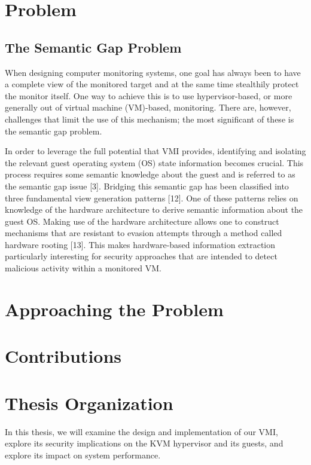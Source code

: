 \documentclass{report}
\begin{document}
\begin{spacing}{1.5}
\section{Problem}
\subsection{The Semantic Gap Problem}
When designing computer monitoring systems, one goal has always been to have a complete view of the
monitored target and at the same time stealthily protect the monitor itself. One way to achieve this is to
use hypervisor-based, or more generally out of virtual machine (VM)-based, monitoring. There are, however,
challenges that limit the use of this mechanism; the most significant of these is the semantic gap problem.



In order to leverage the full potential that VMI provides, identifying and
isolating the relevant guest operating system (OS) state information becomes
crucial. This process requires some semantic knowledge about the guest and is
referred to as the semantic gap issue [3]. Bridging this semantic gap has been
classified into three fundamental view generation patterns [12]. One of these
patterns relies on knowledge of the hardware architecture to derive semantic
information about the guest OS. Making use of the hardware architecture allows
one to construct mechanisms that are resistant to evasion attempts through a
method called hardware rooting [13]. This makes hardware-based information
extraction particularly interesting for security approaches that are intended to
detect malicious activity within a monitored VM.
\section{Approaching the Problem}

\section{Contributions}

\section{Thesis Organization}

In this thesis, we will examine the design and implementation of our VMI, explore its security implications on the KVM hypervisor and its guests, and explore its impact on system performance.


\end{spacing}
\end{document}
